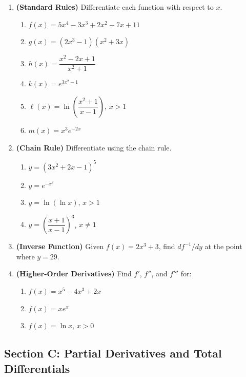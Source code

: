 \documentclass[12pt, a4paper]{article}
\theoremstyle{definition}
\begin{document}
\begin{enumerate}[label=\textbf{B\arabic*.}, leftmargin=2.5em]

\item \textbf{(Standard Rules)}
Differentiate each function with respect to $x$.
\begin{enumerate}[label=(\alph*)]
  \item $f(x) = 5x^4 - 3x^3 + 2x^2 - 7x + 11$
  \item $g(x) = (2x^3-1)(x^2+3x)$
  \item $h(x) = \dfrac{x^2-2x+1}{x^2+1}$
  \item $k(x) = e^{3x^2-1}$
  \item $\ell(x) = \ln\!\left(\dfrac{x^2+1}{x-1}\right)$, $x>1$
  \item $m(x) = x^3 e^{-2x}$
\end{enumerate}

\item \textbf{(Chain Rule)}
Differentiate using the chain rule.
\begin{enumerate}[label=(\alph*)]
  \item $y = (3x^2+2x-1)^5$
  \item $y = e^{-x^2}$
  \item $y = \ln(\ln x)$, $x>1$
  \item $y = \left(\dfrac{x+1}{x-1}\right)^3$, $x\neq 1$
\end{enumerate}

\item \textbf{(Inverse Function)}
Given $f(x) = 2x^3 + 3$, find $df^{-1}/dy$ at the point where $y=29$.

\item \textbf{(Higher-Order Derivatives)}
Find $f'$, $f''$, and $f'''$ for:
\begin{enumerate}[label=(\alph*)]
  \item $f(x) = x^5 - 4x^3 + 2x$
  \item $f(x) = xe^x$
  \item $f(x) = \ln x$, $x>0$
\end{enumerate}

\end{enumerate}

\subsection{Section C: Partial Derivatives and Total Differentials}
\end{document}
